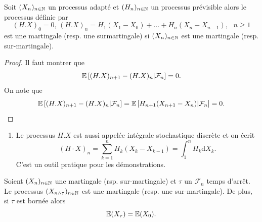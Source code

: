 \begin{prop}\label{prop:ladder_process}
Soit $(X_n)_{n\in\mathbb{N}}$ un processus adapté et $(H_n)_{n\in\mathbb{N}}$ un processus prévisible alors le processus définie par
$$
(H.X)_0 =0\text{, }(H.X)_n =H_1(X_1-X_0)+\ldots+ H_n(X_n-X_{n-1}),\text{ }n\geq1
$$
est une martingale (resp. une surmartingale) si $(X_n)_{n\in\mathbb{N}}$ est une martingale (resp. sur-martingale).
\end{prop}
\begin{proof}
Il faut montrer que
$$
\mathbb{E}\left[(H.X)_{n+1} - (H.X)_{n}|\mathcal{F}_n\right]=0.
$$
On note que
$$
\mathbb{E}\left[(H.X)_{n+1} - (H.X)_{n}|\mathcal{F}_n\right]=\mathbb{E}\left[H_{n+1}(X_{n+1}-X_n)|\mathcal{F}_n\right]=0.
$$
\end{proof}
\begin{remark}
\begin{enumerate}
\item Le processus $H.X$ est aussi appelée intégrale stochastique discrète et on écrit 
 $$
 (H\cdot X)_n = \sum_{k = 1}^n H_{k}(X_{k}-X_{k-1}) = \int_1^n H_k\text{d}X_k.
 $$
 C'est un outil pratique pour les démonstrations.
\end{enumerate}
\end{remark}
\begin{theo}\label{theo:temps_arret}
Soient $(X_n)_{n\in\mathbb{N}}$ une martingale (rsp. sur-martingale) et $\tau$ un $\mathcal{F}_n$ temps d'arrêt. Le processus $(X_{n\land \tau})_{n\in\mathbb{N}}$ est une martingale (resp. une sur-martingale). De plus, si $\tau$ est bornée alors
$$
\mathbb{E}(X_{\tau}) = \mathbb{E}(X_0).
$$
\end{theo}
